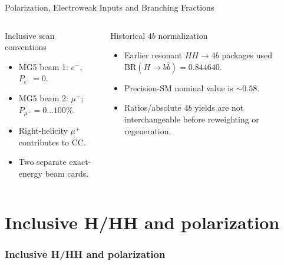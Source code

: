 \documentclass[aspectratio=1610,english]{beamer}
\newcommand{\src}[1]{\vfill{\par\color{black!65}\fontsize{6.4}{7.4}\selectfont\emph{Source:} #1\par}}
\newcommand{\key}[1]{\begin{alertblock}{Physics takeaway}\small  #1\end{alertblock}}
\begin{document}
\begin{frame}[t]{Polarization, Electroweak Inputs and Branching Fractions}
\small

\begin{columns}%
\begin{block}{Inclusive scan conventions}
\begin{itemize}\item MG5 beam 1: $e^-$, $P_{e^-}=0$.
\item MG5 beam 2: $\mu^+$; $P_{\mu^+}=0\ldots100\%$.
\item Right-helicity $\mu^+$ contributes to CC.
\item Two separate exact-energy beam cards.
\end{itemize}
\end{block}
\begin{alertblock}{Historical $4b$ normalization}
\begin{itemize}\item Earlier resonant $HH\to4b$ packages used
$\mathrm{BR}(H\to b\bar b)=0.844640$.
\item Precision-SM nominal value is $\sim0.58$.
\item Ratios/absolute $4b$ yields are not interchangeable before reweighting or regeneration.
\end{itemize}\end{alertblock}
\end{columns}


\end{frame}


\part{Inclusive H/HH and polarization}
\section{Inclusive H/HH and polarization}
\end{document}
